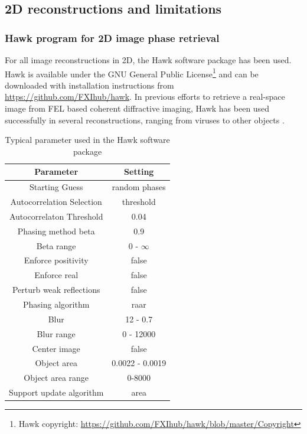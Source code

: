 \subsection{2D reconstructions and limitations}
%
%
%
\subsubsection{Hawk program for 2D image phase retrieval}
For all image reconstructions in 2D, the Hawk software package \citep{Maia-2010-JAC} has been used. Hawk is available under the GNU General Public License\footnote{Hawk copyright: \url{https://github.com/FXIhub/hawk/blob/master/Copyright}} and can be downloaded with installation instructions from \url{https://github.com/FXIhub/hawk}. In previous efforts to retrieve a real-space image from FEL based coherent diffractive imaging, Hawk has been used successfully in several reconstructions, ranging from viruses \citep{Seibert-2011-Nature,Ekeberg-2015-PRL} to other objects \citep{Seibert-2010-JPhysB}.
\begin{table}%
\centering
\begin{tabular}{ |c|c|}
 \hline
 \textbf{Parameter} & \textbf{Setting} \\ 
 \hline
 Starting Guess & random phases \\ \hline
 Autocorrelation Selection & threshold \\ \hline
 Autocorrelaton Threshold & 0.04  \\ \hline
 Phasing method beta & 0.9  \\ \hline
 Beta range & 0 - $\infty$ \\ \hline
 Enforce positivity & false   \\ \hline
 Enforce real & false     \\\hline
Perturb weak reflections & false \\ \hline
Phasing algorithm & raar \\ \hline
Blur & 12 - 0.7 \\ \hline
Blur range & 0 - 12000 \\ \hline
Center image & false \\ \hline
Object area & 0.0022 - 0.0019 \\ \hline
Object area range & 0-8000\\ \hline
Support update algorithm & area \\ \hline
\end{tabular}
\caption{Typical parameter used in the Hawk software package}
\label{tab:hawk-parameter}
\end{table}
